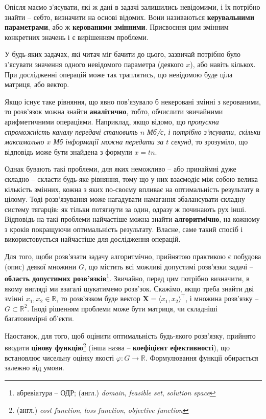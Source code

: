 \documentclass[../book.tex]{subfiles}
\begin{document}
Опісля маємо з'ясувати, які ж дані в задачі залишились невідомими, і їх потрібно знайти -- себто, визначити на основі відомих. Вони називаються \textbf{керувальними параметрами}, або ж \textbf{керованими змінними}. Присвоєння цим змінним конкретних значень і є вирішенням проблеми.

У будь-яких задачах, які читач міг бачити до цього, зазвичай по\-тріб\-но було з'ясувати значення одного невідомого параметра (деякого $x$), або навіть кількох. При дослідженні операцій може так траплятись, що невідомою буде ціла матриця, або вектор.

Якщо існує таке рівняння, що явно пов'язувало б некеровані змінні з керованими, то розв'язок можна знайти \textbf{аналітично}, тобто, обчислити звичайними арифметичними операціями. Наприклад, якщо відомо, що \textit{пропускна спроможність каналу передачі становить $n$ Мб/с, і потрібно з'ясувати, скільки максимально $x$ Мб інформації можна передати за $t$ секунд}, то зрозуміло, що відповідь може бути знайдена з формули ${x=tn}$.

Однак бувають такі проблеми, для яких неможливо -- або принаймні дуже складно -- скласти будь-яке рівняння, тому що у них взаємодіє між собою велика кількість змінних, кожна з яких по-своєму впливає на оптимальність результату в цілому. Тоді розв'язування може нагадувати намагання збалансувати складну систему тягарців: як тільки потягнути за один, одразу ж починають рух інші. Відповідь на такі проблеми найчастіше можна знайти \textbf{алгоритмічно}, на кожному з кроків покращуючи оптимальність результату. Власне, саме такий спосіб і використовується найчастіше для дослідження операцій.

Для того, щоби розв'язати задачу алгоритмічно, прийнятою практикою є побудова (опис) деякої множини $G$, що містить всі можливі допустимі розв'язки задачі -- \textbf{область допустимих розв'язків}\footnote{абревіатура -- ОДР; (англ.) \textit{domain}, \textit{feasible set}, \textit{solution space}}. Звичайно, перед цим потрібно визначити, в якому вигляді ми взагалі шукатимемо розв'зок. Скажімо, якщо треба знайти дві змінні $x_1, x_2 \in \mathbb{R}$, то розв'язком буде вектор $\mathbf{X} = {\langle x_1, x_2 \rangle^\top}$, і множина розв'язку -- $G \subset \mathbb{R}^2$. Іноді рішенням проблеми може бути матриця, чи складніші багатовимірні об'єкти.

Наостанок, для того, щоб оцінити оптимальність будь-якого роз\-в'яз\-ку, прийнято вводити \textbf{цінову функцію}\footnote{(англ.) \textit{cost function}, \textit{loss function}, \textit{objective function}} (інша назва -- \textbf{коефіцієнт ефективності}), що встановлює чисельну оцінку якості ${\varphi: G \rightarrow \mathbb{R}}$. Формулювання функції обирається залежно від умови.
\end{document}
